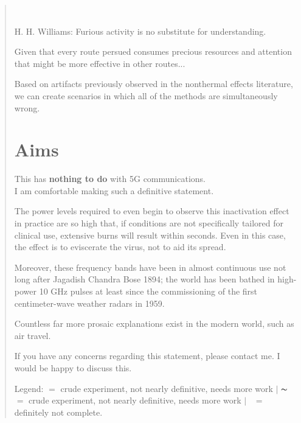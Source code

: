\documentclass[paper.tex]{subfiles}
\begin{document}
\begin{quotation}\

H. H. Williams: Furious activity is no substitute for understanding.

Given that every route persued consumes precious resources and attention that might be more effective in 
other routes...



Based on artifacts previously observed in the nonthermal effects literature, we can create scenarios in which all of the methods are simultaneously wrong. 

\section{Aims}




\begin{autem}
	
	{\Large {This has \textbf{nothing to do} with 5G communications.}}\\
	
	I am comfortable making such a definitive statement.
	
	The power levels required to even begin to observe this inactivation effect in practice are so high that, if conditions are not specifically tailored for clinical use, extensive burns will result within seconds. Even in this case, the effect is to eviscerate the virus, not to aid its spread. 
	
	Moreover, these frequency bands have been in almost continuous use not long after Jagadish Chandra Bose 1894; the world has been bathed in high-power 10 GHz pulses at least since the commissioning of the first centimeter-wave weather radars in 1959. 
	
	Countless far more prosaic explanations exist in the modern world, such as air travel.
	
	If you have any concerns regarding this statement, please contact me. I would be happy to discuss this.
	
\end{autem}




Legend:  \cmark $ = $ crude experiment, not nearly definitive, needs more work $\vert$ $\thicksim$ $ = $ crude experiment, not nearly definitive, needs more work $\vert$ \xmark \ $ = $ definitely not complete.\\


\end{quotation}
\end{document}
